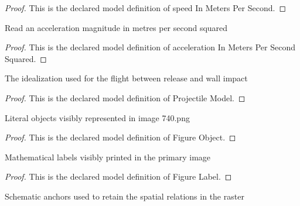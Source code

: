 \begin{proof}
  This is the declared model definition of speed In Meters Per Second.
\end{proof}
\begin{definition}
  \label{def:physics:phyx-mini-0740:phyxminiproblems-problemphyxmini0740-accelerationinmeterspersecondsquared}
  Read an acceleration magnitude in metres per second squared
\end{definition}
\begin{proof}
  This is the declared model definition of acceleration In Meters Per Second Squared.
\end{proof}
\begin{definition}
  \label{def:physics:phyx-mini-0740:phyxminiproblems-problemphyxmini0740-projectilemodel}
  The idealization used for the flight between release and wall impact
\end{definition}
\begin{proof}
  This is the declared model definition of Projectile Model.
\end{proof}
\begin{definition}
  \label{def:physics:phyx-mini-0740:phyxminiproblems-problemphyxmini0740-figureobject}
  Literal objects visibly represented in image 740.png
\end{definition}
\begin{proof}
  This is the declared model definition of Figure Object.
\end{proof}
\begin{definition}
  \label{def:physics:phyx-mini-0740:phyxminiproblems-problemphyxmini0740-figurelabel}
  Mathematical labels visibly printed in the primary image
\end{definition}
\begin{proof}
  This is the declared model definition of Figure Label.
\end{proof}
\begin{definition}
  \label{def:physics:phyx-mini-0740:phyxminiproblems-problemphyxmini0740-figureanchor}
  Schematic anchors used to retain the spatial relations in the raster
\end{definition}
